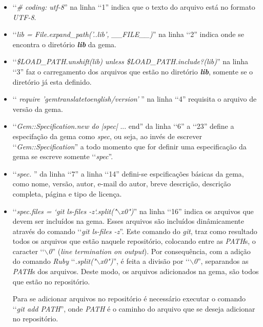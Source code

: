 \begin{itemize}

 \item ‘‘\emph{\# coding: utf-8}'' na linha ‘‘1'' indica que o texto do arquivo está no formato \emph{UTF-8}.
 
 \item ‘‘\emph{lib = File.expand\_path('..\/lib', \_\_FILE\_\_)}'' na linha ‘‘2'' indica onde se encontra o 
 diretório \emph{\textbf{lib}} da gema.
 
 \item ‘‘\emph{\$LOAD\_PATH.unshift(lib) unless \$LOAD\_PATH.include?(lib)}'' na linha ‘‘3'' faz o 
 carregamento dos arquivos que estão no diretório \emph{\textbf{lib}}, somente se o diretório já
 esta definido.
 
 \item ‘‘ \emph{require 'gemtranslatetoenglish/version'} '' na linha ‘‘4'' requisita o arquivo de versão da
 gema.
 
 \item ‘‘\emph{Gem::Specification.new do |spec|} ... end'' da linha ‘‘6'' a ‘‘23'' define a especifação da
 gema como \emph{spec}, ou seja, ao invés de escrever ‘‘\emph{Gem::Specification}'' a todo momento que for 
 definir uma especificação da gema se escreve somente ‘‘\emph{spec}''.
 
 \item ‘‘\emph{spec. }'' da linha ‘‘7'' a linha ‘‘14'' defini-se espcificações básicas da gema, como nome,
 versão, autor, e-mail do autor, breve descrição, descrição completa, página e tipo de licença.
 
 \item ‘‘\emph{spec.files = `git ls-files -z`.split("$\backslash$x0")}'' na linha ‘‘16'' indica os arquivos
 que devem ser incluídos na gema. Esses arquivos são incluídos dinâmicamente através do comando 
 ‘‘\emph{git ls-files -z}''. Este comando do \emph{git}, traz como resultado todos os arquivos que estão
 naquele repositório, colocando entre as \emph{PATH}s, o caracter ‘‘\emph{$\backslash$0}'' 
 (\emph{line termination on output}). Por consequência, com a adição do comando \emph{Ruby} 
 ‘‘\emph{.split("$\backslash$x0")}'', é feita a divisão por ‘‘\emph{$\backslash$0}'', separandos as
 \emph{PATH}s dos arquivos. Deste modo, os arquivos adicionados na gema, são todos que estão no repositório. 
 
 Para se adicionar arquivos no repositório é necessário executar o comando ‘‘\emph{git add PATH}'', 
 onde \emph{PATH} é o caminho do arquivo que se deseja adicionar no repositório.
 

\end{itemize}
